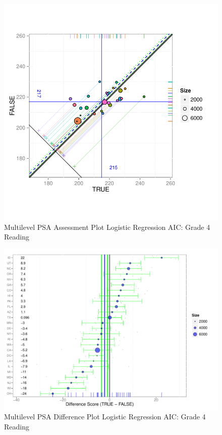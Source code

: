 \documentclass[letterpaper,12p,twoside]{article} %
\begin{document}
\begin{figure}[h!]
\begin{center}
\includegraphics[width=\textwidth]{../Figures2009/g4read-mlpsa-lrAIC-circ.pdf}
\caption{Multilevel PSA Assessment Plot Logistic Regression AIC: Grade 4 Reading}
\end{center}
\end{figure}

\begin{figure}[h!]
\begin{center}
\includegraphics[width=\textwidth]{../Figures2009/g4read-mlpsa-lrAIC-diff.pdf}
\caption{Multilevel PSA Difference Plot Logistic Regression AIC: Grade 4 Reading}
\end{center}
\end{figure}
\end{document}
